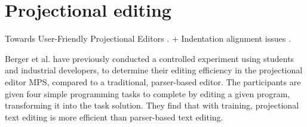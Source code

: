 \section{Projectional editing}
Towards User-Friendly Projectional Editors \cite{voelter2014towards}.
+ Indentation alignment issues \cite{behringer2017peopl} .

Berger et al. \cite{berger2016mps} have previously conducted a controlled experiment using students and industrial developers, to determine their editing efficiency in the projectional editor MPS, compared to a traditional, parser-based editor. The participants are given four simple programming tasks to complete by editing a given program, transforming it into the task solution. They find that with training, projectional text editing is more efficient than parser-based text editing.

